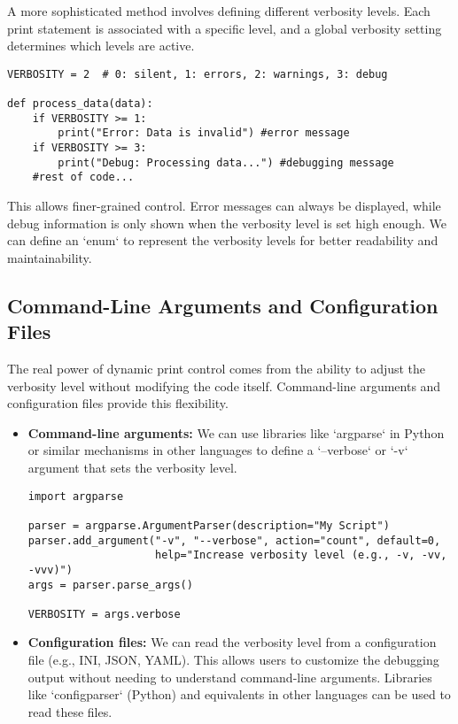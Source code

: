 \documentclass{article}
\begin{document}
{{{A more sophisticated method involves defining different verbosity levels. Each print statement is associated with a specific level, and a global verbosity setting determines which levels are active.

\begin{verbatim}
VERBOSITY = 2  # 0: silent, 1: errors, 2: warnings, 3: debug

def process_data(data):
    if VERBOSITY >= 1:
        print("Error: Data is invalid") #error message
    if VERBOSITY >= 3:
        print("Debug: Processing data...") #debugging message
    #rest of code...
\end{verbatim}

This allows finer-grained control. Error messages can always be displayed, while debug information is only shown when the verbosity level is set high enough.  We can define an `enum` to represent the verbosity levels for better readability and maintainability.

\subsection*{Command-Line Arguments and Configuration Files}

The real power of dynamic print control comes from the ability to adjust the verbosity level without modifying the code itself.  Command-line arguments and configuration files provide this flexibility.

\begin{itemize}
    \item \textbf{Command-line arguments:}  We can use libraries like `argparse` in Python or similar mechanisms in other languages to define a `--verbose` or `-v` argument that sets the verbosity level.

\begin{verbatim}
import argparse

parser = argparse.ArgumentParser(description="My Script")
parser.add_argument("-v", "--verbose", action="count", default=0,
                    help="Increase verbosity level (e.g., -v, -vv, -vvv)")
args = parser.parse_args()

VERBOSITY = args.verbose
\end{verbatim}

    \item \textbf{Configuration files:} We can read the verbosity level from a configuration file (e.g., INI, JSON, YAML).  This allows users to customize the debugging output without needing to understand command-line arguments.  Libraries like `configparser` (Python) and equivalents in other languages can be used to read these files.


\end{itemize}}}}
\end{document}
